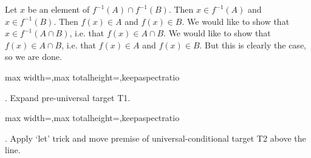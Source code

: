 \documentclass[a4paper,twoside,12pt]{article} %
\makeatletter
\DeclareRobustCommand{\_}{%
  \leavevmode\vbox{%
    \hrule\@width.4em
          \@height-.16ex
          \@depth\dimexpr.16ex+.28pt\relax}}
\newcommand\Tstrut{\rule{0pt}{2.4ex}}
\newcommand\Bstrut{\rule[-1.1ex]{0pt}{0pt}}
\newenvironment{fit}{\begin{adjustbox}{max width=\textwidth,max totalheight=\textheight,keepaspectratio}}{\end{adjustbox}}
\makeatother
\begin{document}
\begin{center}
\begin{minipage}{120mm}
Let $x$ be an element of $f^{-1}(A)\cap f^{-1}(B)$. Then $x\in f^{-1}(A)$ and $x\in f^{-1}(B)$. Then $f(x)\in A$ and $f(x)\in B$. We would like to show that $x\in f^{-1}(A\cap B)$, i.e. that $f(x)\in A\cap B$. We would like to show that $f(x)\in A\cap B$, i.e. that $f(x)\in A$ and $f(x)\in B$. But this is clearly the case, so we are done.
\end{minipage}
\end{center}

\bigskip
\begin{steps}
\begin{fit}%
\end{fit}
\smallskip

. Expand pre-universal target T1.\nopagebreak[4] 
\marginpar{}\nopagebreak[4] 
\smallskip\nopagebreak[4] 

\begin{fit}%
\end{fit}
\smallskip

. Apply `let' trick and move premise of universal-conditional target T2 above the line.\nopagebreak[4] 
\nopagebreak[4] 
\smallskip\nopagebreak[4] 


\end{steps}
\end{document}
